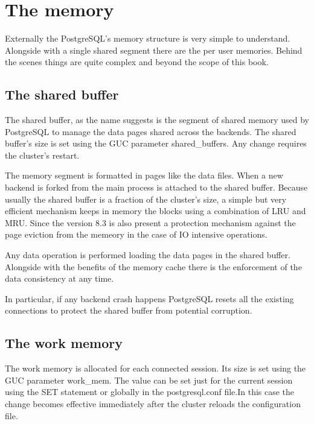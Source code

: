 \section{The memory}
\label{sec:MEMORY}
Externally the PostgreSQL's memory structure is very simple to understand. Alongside with a single
shared segment there are the per user memories. Behind the scenes things are quite complex and
beyond the scope of this book.

\subsection{The shared buffer}
The shared buffer, as the name suggests is the segment of shared memory used by PostgreSQL to manage
the data pages shared across the backends. The shared buffer's size is set using the GUC parameter
shared\_buffers. Any change requires the cluster's restart.\newline

The memory segment is formatted in pages like the data files. When a new backend is forked
from the main process is attached to the shared buffer. Because usually the shared buffer is
a fraction of the cluster's size, a simple but very efficient mechanism keeps in memory the blocks
using a combination of LRU and MRU. Since the version 8.3 is also present a protection mechanism
against the page eviction from the memeory in the case of IO intensive  operations.\newline

Any data operation is performed loading the data pages in the shared buffer. Alongside with the
benefits of the memory cache there is the enforcement of the data consistency at any time.\newline

In particular, if any backend crash happens PostgreSQL resets all the existing connections to
protect the shared buffer from potential corruption. 



\subsection{The work memory}
\label{sub:WORKMEM}
The work memory is allocated for each connected session. Its size  is set using the GUC parameter
work\_mem. The value can be set just for the current session using the SET statement or globally in
the postgresql.conf file.In this case the change becomes effective immediately after the cluster
reloads the configuration file.\newline


